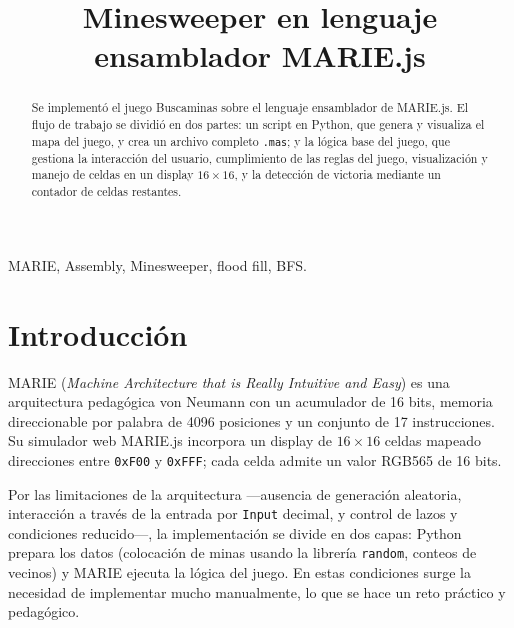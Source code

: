 \documentclass[conference]{IEEEtran}
\begin{document}
\title{Minesweeper en lenguaje ensamblador MARIE.js}

\author{
}

\maketitle

\begin{abstract}
Se implementó el juego Buscaminas sobre el lenguaje ensamblador de MARIE.js. El flujo de trabajo se dividió en dos partes: un script en Python, que genera y visualiza el mapa del juego, y crea un archivo completo \texttt{.mas}; y la lógica base del juego, que gestiona la interacción del usuario, cumplimiento de las reglas del juego, visualización y manejo de celdas en un display $16 \times 16$, y la detección de victoria mediante un contador de celdas restantes.
\end{abstract}

\begin{IEEEkeywords}
MARIE, Assembly, Minesweeper, flood fill, BFS.
\end{IEEEkeywords}

\section{Introducción}

MARIE (\textit{Machine Architecture that is Really Intuitive and Easy}) \cite{null2014essentials} es una arquitectura pedagógica von Neumann con un acumulador de 16 bits, memoria direccionable por palabra de 4096 posiciones y un conjunto de 17 instrucciones. Su simulador web MARIE.js \cite{mariejs} incorpora un display de $16 \times 16$ celdas mapeado direcciones entre \texttt{0xF00} y \texttt{0xFFF}; cada celda admite un valor RGB565 de 16 bits.

Por las limitaciones de la arquitectura ---ausencia de generación aleatoria, interacción a través de la entrada por \texttt{Input} decimal, y control de lazos y condiciones reducido---, la implementación se divide en dos capas: Python prepara los datos (colocación de minas usando la librería \texttt{random}, conteos de vecinos) y MARIE ejecuta la lógica del juego. En estas condiciones surge la necesidad de implementar mucho manualmente, lo que se hace un reto práctico y pedagógico.
\end{document}
